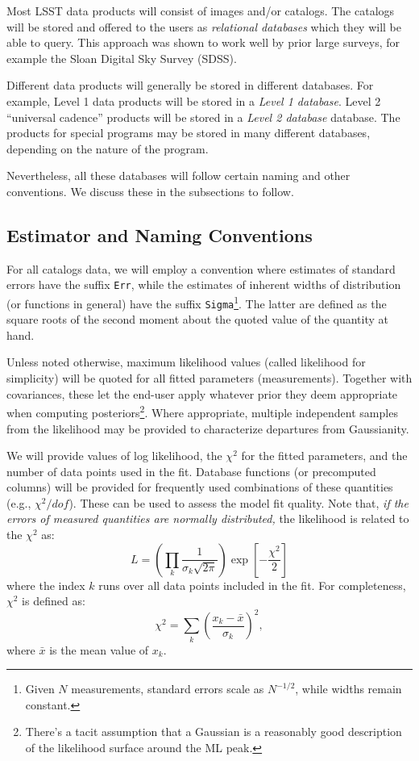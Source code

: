 \documentclass[12pt]{article}
\newcommand{\req}[1]{\marginpar{\tiny #1}}
\newcommand{\dmreq}[1]{\req{DMS-REQ-#1}}
\begin{document}
Most LSST data products will consist of images and/or catalogs. The catalogs will be stored and offered to the users as \emph{relational databases} which they will be able to query. This approach was shown to work well by prior large surveys, for example the Sloan Digital Sky Survey (SDSS).

Different data products will generally be stored in different databases. For example, Level 1 data products will be stored in a \emph{Level 1 database}. Level 2 ``universal cadence'' products will be stored in a \emph{Level 2 database} database. The products for special programs may be stored in many different databases, depending on the nature of the program.

Nevertheless, all these databases will follow certain naming and other conventions. We discuss these in the subsections to follow.



\subsection{Estimator and Naming Conventions}

For all catalogs data, we will employ a convention where estimates of standard errors have the suffix \texttt{Err}, while the estimates of inherent widths of distribution (or functions in general) have the suffix \texttt{Sigma}\footnote{Given $N$ measurements, standard errors scale as $N^{-1/2}$, while widths remain constant.}. The latter are defined as the square roots of the second moment about the quoted value of the quantity at hand.

\dmreq{0333}
Unless noted otherwise, maximum likelihood values (called likelihood for simplicity) will be quoted for all fitted parameters (measurements). Together with covariances, these let the end-user apply whatever prior they deem appropriate when computing posteriors\footnote{There's a tacit assumption that a Gaussian is a reasonably good description of the likelihood surface around the ML peak.}. Where appropriate, multiple independent samples from the likelihood may be provided to characterize departures from Gaussianity.

We will provide values of log likelihood, the $\chi^2$ for the fitted parameters, and the number of data points used in the fit. \dmreq{0331}Database functions (or precomputed columns) will be provided for frequently used combinations of these quantities (e.g., $\chi^2/dof$). These can be used to assess the model fit quality. Note that, \textit{if the errors of measured quantities are normally distributed,} the likelihood is related to the $\chi^2$ as:
%
\begin{equation}
    L = \left(\prod_{k}\frac{1}{\sigma_k \sqrt{2 \pi}}\right) \exp \left[- \frac{\chi^2}{2}\right]
\end{equation}
%
where the index $k$ runs over all data points included in the fit.
For completeness, $\chi^2$ is defined as:
%
\begin{equation}
      \chi^2 = \sum_{k} \left( \frac{x_k-\bar{x}}{\sigma_k}\right)^2,
\end{equation}
%
where $\bar{x}$ is the mean value of $x_k$.
\\
\end{document}
